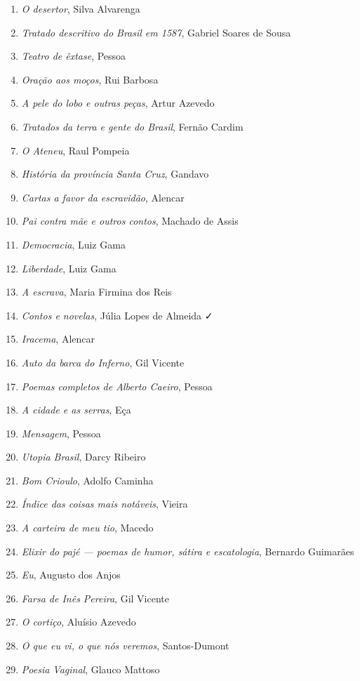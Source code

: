 \begin{enumerate}
\setlength\parskip{4.2pt}
\setlength\itemsep{-1.4mm}
\item \textit{O desertor}, Silva Alvarenga
\item \textit{Tratado descritivo do Brasil em 1587}, Gabriel Soares de Sousa
\item \textit{Teatro de êxtase}, Pessoa
\item \textit{Oração aos moços}, Rui Barbosa
\item \textit{A pele do lobo e outras peças}, Artur Azevedo
\item \textit{Tratados da terra e gente do Brasil}, Fernão Cardim 
\item \textit{O Ateneu}, Raul Pompeia
\item \textit{História da província Santa Cruz}, Gandavo
\item \textit{Cartas a favor da escravidão}, Alencar
\item \textit{Pai contra mãe e outros contos}, Machado de Assis
\item \textit{Democracia}, Luiz Gama
\item \textit{Liberdade}, Luiz Gama
\item \textit{A escrava}, Maria Firmina dos Reis
\item \textit{Contos e novelas}, Júlia Lopes de Almeida ✓
\item \textit{Iracema}, Alencar
\item \textit{Auto da barca do Inferno}, Gil Vicente
\item \textit{Poemas completos de Alberto Caeiro}, Pessoa
\item \textit{A cidade e as serras}, Eça
\item \textit{Mensagem}, Pessoa
\item \textit{Utopia Brasil}, Darcy Ribeiro
\item \textit{Bom Crioulo}, Adolfo Caminha
\item \textit{Índice das coisas mais notáveis}, Vieira
\item \textit{A carteira de meu tio}, Macedo
\item \textit{Elixir do pajé --- poemas de humor, sátira e escatologia}, Bernardo Guimarães
\item \textit{Eu}, Augusto dos Anjos
\item \textit{Farsa de Inês Pereira}, Gil Vicente
\item \textit{O cortiço}, Aluísio Azevedo
\item \textit{O que eu vi, o que nós veremos}, Santos-Dumont
\item \textit{Poesia Vaginal}, Glauco Mattoso 
\end{enumerate}

